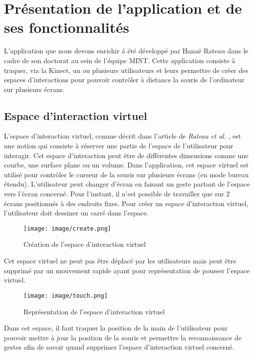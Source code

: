 \chapter{Présentation de l’application et de ses fonctionnalités}

L’application que nous devons enrichir á été développé par Hanaë Rateau dans le cadre de son doctorat au sein de l’équipe MINT. Cette application consiste à traquer, via la Kinect, un ou plusieurs utilisateurs et leurs permettre de créer des espaces d’interactions pour pouvoir contrôler à distance la souris de l’ordinateur sur plusieurs écrans.

\section{Espace d’interaction virtuel}

L’espace d’interaction virtuel, comme décrit dans l'article de \textit{Rateau et al.} \cite{rateau:hal-00851935},  est une notion qui consiste à réserver une partie de l’espace de l’utilisateur pour interagir. Cet espace d’interaction peut être de différentes dimensions comme une courbe, une surface plane ou un volume.  Dans l’application, cet espace virtuel est utilisé pour contrôler le curseur de la souris sur plusieurs écrans (en mode bureau étendu). L’utilisateur peut changer d’écran en faisant un geste partant de l’espace vers l’écran concerné. Pour l’instant, il n’est possible de travailler que sur 2 écrans positionnés à des endroits fixes. Pour créer un espace d’interaction virtuel, l’utilisateur doit dessiner un carré dans l’espace. 
	 
\begin{figure}[!ht]
	\center	
	\texttt{[image: image/create.png]}
	\caption{Création de l'espace d'interaction virtuel}
\end{figure}

Cet espace virtuel ne peut pas être déplacé par les utilisateurs mais peut être supprimé par un mouvement rapide ayant pour représentation de pousser l’espace virtuel.

\begin{figure}[!ht]
	\center	
	\texttt{[image: image/touch.png]}
	\caption{Représentation de l'espace d'interaction virtuel}
\end{figure}

Dans cet espace, il faut traquer la position de la main de l’utilisateur pour pouvoir mettre à jour la position de la souris et permettre la reconnaissance de gestes afin de savoir quand supprimer l’espace d’interaction virtuel concerné.

